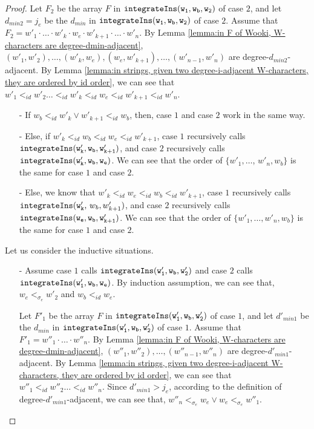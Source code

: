 \begin {proof}
Let $F_2$ be the array $F$ in $\alabelshort[{\tt integrateIns}]{w_1,w_b,w_2}$ of case $2$, and let $d_{min2}=j_e$ be the $d_{min}$ in $\alabelshort[{\tt integrateIns}]{w_1,w_b,w_2}$ of case $2$. Assume that $F_2 = w'_1 \cdot \ldots \cdot w'_k \cdot w_e \cdot w'_{k+1} \cdot \ldots \cdot w'_n$. By Lemma \ref{lemma:in F of Wooki, W-characters are degree-dmin-adjacent}, $(w'_1,w'_2),\ldots,(w'_k,w_e),(w_e,w'_{k+1}),\ldots,(w'_{n-1},w'_n)$ are degree-$d_{min2}$-adjacent. By Lemma \ref{lemma:in strings, given two degree-i-adjacent W-characters, they are ordered by id order}, we can see that $w'_1 <_{id} w'_2 \ldots <_{id} w'_k <_{id} w_e <_{id} w'_{k+1} <_{id} w'_n$.

\begin{itemize}
\setlength{\itemsep}{0.5pt}
\item[-] If $w_b <_{id} w'_k \vee w'_{k+1} <_{id} w_b$, then, case $1$ and case $2$ work in the same way.

\item[-] Else, if $w'_k <_{id} w_b <_{id} w_e <_{id} w'_{k+1}$, case $1$ recursively calls $\alabelshort[{\tt integrateIns}]{w'_k,w_b,w'_{k+1}}$, and case $2$ recursively calls $\alabelshort[{\tt integrateIns}]{w'_k,w_b,w_e}$. We can see that the order of $\{ w'_1,\ldots$, $w'_n,w_b \}$ is the same for case $1$ and case $2$.

\item[-] Else, we know that $w'_k <_{id} w_e <_{id} w_b <_{id} w'_{k+1}$, case $1$ recursively calls $\alabelshort[{\tt integrateIns}]{w'_k$, $w_b,w'_{k+1}}$, and case $2$ recursively calls $\alabelshort[{\tt integrateIns}]{w_e,w_b,w'_{k+1}}$. We can see that the order of $\{ w'_1,\ldots,w'_n,w_b \}$ is the same for case $1$ and case $2$.
\end{itemize}

 Let us consider the inductive situations.

\begin{itemize}
\setlength{\itemsep}{0.5pt}
\item[-] Assume case $1$ calls $\alabelshort[{\tt integrateIns}]{w'_1,w_b,w'_2}$ and case $2$ calls $\alabelshort[{\tt integrateIns}]{w'_1,w_b,w_e}$. By induction assumption, we can see that, $w_e <_{\sigma_e} w'_2$ and $w_b <_{id} w_e$.

    Let $F'_1$ be the array $F$ in $\alabelshort[{\tt integrateIns}]{w'_1,w_b,w'_2}$ of case $1$, and let $d'_{min1}$ be the $d_{min}$ in $\alabelshort[{\tt integrateIns}]{w'_1,w_b,w'_2}$ of case $1$. Assume that $F'_1 = w''_1 \cdot \ldots \cdot w''_n$. By Lemma \ref{lemma:in F of Wooki, W-characters are degree-dmin-adjacent}, $(w''_1,w''_2),\ldots,(w''_{n-1},w''_n)$ are degree-$d'_{min1}$-adjacent. By Lemma \ref{lemma:in strings, given two degree-i-adjacent W-characters, they are ordered by id order}, we can see that $w''_1 <_{id} w''_2 \ldots <_{id} w''_n$. Since $d'_{min1} > j_e$, according to the definition of degree-$d'_{min1}$-adjacent, we can see that, $w''_n <_{\sigma_e} w_e \vee w_e <_{\sigma_e} w''_1$.


\end{itemize}
\end{proof}
